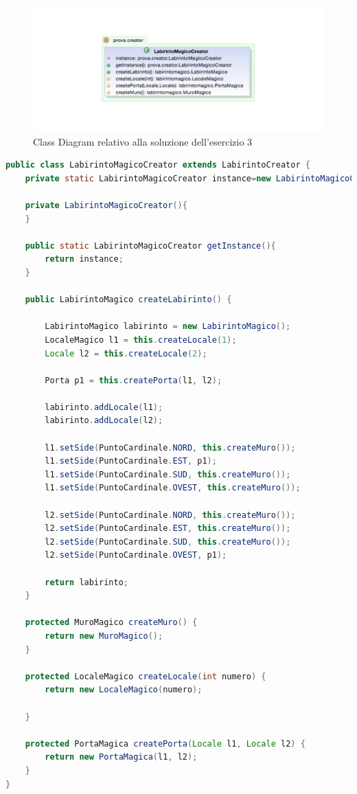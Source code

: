 \documentclass{article}
\begin{document}
\begin{figure}[h]
\includegraphics[width=1\textwidth]{Img/SingletonLabirintoMagico.pdf}
\caption{Class Diagram relativo alla soluzione dell'esercizio 3}
\label{Fig:labirintoMagico}
\end{figure}

\begin{lstlisting}[language=Java]
public class LabirintoMagicoCreator extends LabirintoCreator {
    private static LabirintoMagicoCreator instance=new LabirintoMagicoCreator();
	
	private LabirintoMagicoCreator(){
	}
	
	public static LabirintoMagicoCreator getInstance(){
		return instance;
	}
	
	public LabirintoMagico createLabirinto() {

		LabirintoMagico labirinto = new LabirintoMagico();
		LocaleMagico l1 = this.createLocale(1);
		Locale l2 = this.createLocale(2);

		Porta p1 = this.createPorta(l1, l2);

		labirinto.addLocale(l1);
		labirinto.addLocale(l2);

		l1.setSide(PuntoCardinale.NORD, this.createMuro());
		l1.setSide(PuntoCardinale.EST, p1);
		l1.setSide(PuntoCardinale.SUD, this.createMuro());
		l1.setSide(PuntoCardinale.OVEST, this.createMuro());

		l2.setSide(PuntoCardinale.NORD, this.createMuro());
		l2.setSide(PuntoCardinale.EST, this.createMuro());
		l2.setSide(PuntoCardinale.SUD, this.createMuro());
		l2.setSide(PuntoCardinale.OVEST, p1);

		return labirinto;
	}

	protected MuroMagico createMuro() {
		return new MuroMagico();
	}

	protected LocaleMagico createLocale(int numero) {
		return new LocaleMagico(numero);

	}

	protected PortaMagica createPorta(Locale l1, Locale l2) {
		return new PortaMagica(l1, l2);
	}
}
\end{lstlisting}
\end{document}

